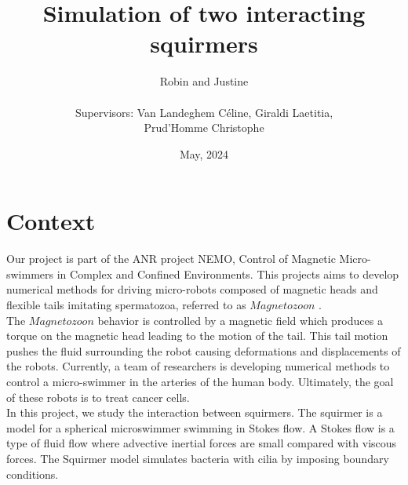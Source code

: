 \documentclass{article}
\begin{document}
\title{Simulation of two interacting squirmers}
\author{Robin and Justine\\
\\
Supervisors: Van Landeghem Céline, Giraldi Laetitia,\\ Prud'Homme Christophe}
\date{May, 2024}
\maketitle

\tableofcontents

\section{Context}
Our project is part of the ANR project NEMO, Control of Magnetic Micro-swimmers in Complex and Confined Environments.
This projects aims to develop numerical methods for driving micro-robots composed of magnetic heads and flexible tails imitating spermatozoa, referred to as $Magnetozoon$ \cite{Nemov10}.\\
The $Magnetozoon$ behavior is controlled by a magnetic field which produces a torque on the magnetic head leading to the motion of the tail.
This tail motion pushes the fluid surrounding the robot causing deformations and displacements of the robots.
Currently, a team of researchers is developing numerical methods to control a micro-swimmer in the arteries
of the human body. Ultimately, the goal of these robots is to treat cancer cells. \\
In this project, we study the interaction between squirmers. The squirmer is a model for a spherical microswimmer swimming in Stokes flow. \cite{Wikipedia}
A Stokes flow is a type of fluid flow where advective inertial forces are small compared with viscous forces.
The Squirmer model simulates bacteria with cilia by imposing boundary conditions.


\vspace{0.5cm}
\end{document}

